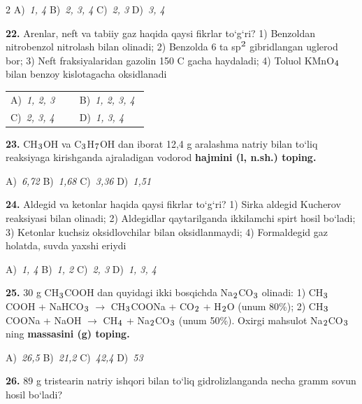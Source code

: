 \documentclass[11pt,a4paper]{article}
\renewcommand{\textsubscript}[1]{\ensuremath{_{\text{\fontsize{8}{8}\selectfont #1}}}}
\renewcommand{\textsuperscript}[1]{\ensuremath{^{\text{\fontsize{8}{8}\selectfont #1}}}}
\begin{document}
\begin{multicols}{2}
\noindent A)~\textsl{1, 4} \hfill B)~\textsl{2, 3, 4} \hfill C)~\textsl{2, 3} \hfill D)~\textsl{3, 4}\par
\vspace{4pt}
\noindent\textbf{22.} Arenlar, neft va tabiiy gaz haqida qaysi fikrlar to`g`ri? 1) Benzoldan nitrobenzol nitrolash bilan olinadi; 2) Benzolda 6 ta sp\textsuperscript{2} gibridlangan uglerod bor; 3) Neft fraksiyalaridan gazolin 150 \textdegree{}C gacha haydaladi; 4) Toluol KMnO\textsubscript{4} bilan benzoy kislotagacha oksidlanadi

\noindent\begin{tabular}{@{}p{0.47\linewidth}@{}p{0.47\linewidth}@{}}
A)~\textsl{1, 2, 3} & B)~\textsl{1, 2, 3, 4} \\
C)~\textsl{2, 3, 4} & D)~\textsl{1, 3, 4} \\
\end{tabular}\par
\vspace{4pt}
\noindent\textbf{23.} CH\textsubscript{3}OH va C\textsubscript{3}H\textsubscript{7}OH dan iborat 12,4 g aralashma natriy bilan to`liq reaksiyaga kirishganda ajraladigan vodorod \textbf{hajmini (l, n.sh.) toping.}

\noindent A)~\textsl{6,72} \hfill B)~\textsl{1,68} \hfill C)~\textsl{3,36} \hfill D)~\textsl{1,51}\par
\vspace{4pt}
\noindent\textbf{24.} Aldegid va ketonlar haqida qaysi fikrlar to`g`ri? 1) Sirka aldegid Kucherov reaksiyasi bilan olinadi; 2) Aldegidlar qaytarilganda ikkilamchi spirt hosil bo`ladi; 3) Ketonlar kuchsiz oksidlovchilar bilan oksidlanmaydi; 4) Formaldegid gaz holatda, suvda yaxshi eriydi

\noindent A)~\textsl{1, 4} \hfill B)~\textsl{1, 2} \hfill C)~\textsl{2, 3} \hfill D)~\textsl{1, 3, 4}\par
\vspace{4pt}
\noindent\textbf{25.} 30 g CH\textsubscript{3}COOH dan quyidagi ikki bosqichda Na\textsubscript{2}CO\textsubscript{3} olinadi: 1) CH\textsubscript{3}COOH + NaHCO\textsubscript{3} $\to$ CH\textsubscript{3}COONa + CO\textsubscript{2} + H\textsubscript{2}O (unum 80\%); 2) CH\textsubscript{3}COONa + NaOH $\to$ CH\textsubscript{4} + Na\textsubscript{2}CO\textsubscript{3} (unum 50\%). Oxirgi mahsulot Na\textsubscript{2}CO\textsubscript{3} ning \textbf{massasini (g) toping.}

\noindent A)~\textsl{26,5} \hfill B)~\textsl{21,2} \hfill C)~\textsl{42,4} \hfill D)~\textsl{53}\par
\vspace{4pt}
\noindent\textbf{26.} 89 g tristearin natriy ishqori bilan to`liq gidrolizlanganda necha gramm sovun hosil bo`ladi?


\end{multicols}
\end{document}

